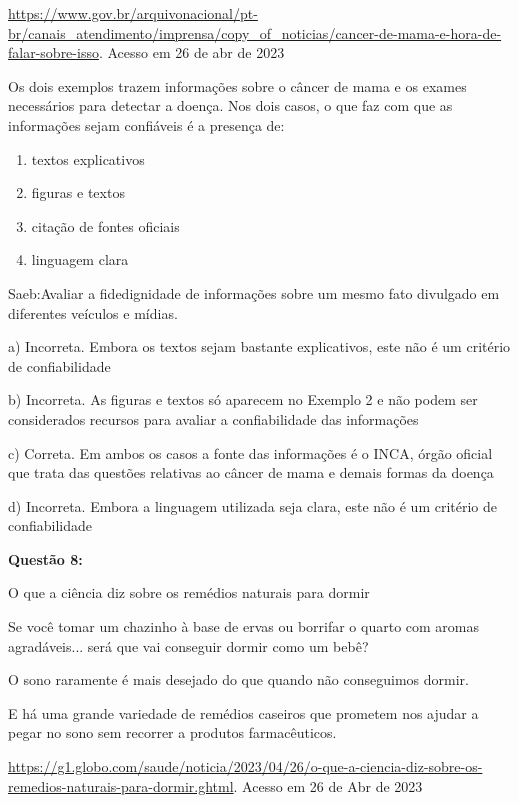 \href{https://www.gov.br/arquivonacional/pt-br/canais_atendimento/imprensa/copy_of_noticias/cancer-de-mama-e-hora-de-falar-sobre-isso}{{https://www.gov.br/arquivonacional/pt-br/canais\_atendimento/imprensa/copy\_of\_noticias/cancer-de-mama-e-hora-de-falar-sobre-isso}}.
Acesso em 26 de abr de 2023

Os dois exemplos trazem informações sobre o câncer de mama e os exames
necessários para detectar a doença. Nos dois casos, o que faz com que as
informações sejam confiáveis é a presença de:

\begin{enumerate}
\def\labelenumi{\alph{enumi})}
\item
  textos explicativos
\item
  figuras e textos
\item
  citação de fontes oficiais
\item
  linguagem clara
\end{enumerate}

Saeb:Avaliar a fidedignidade de informações sobre um mesmo fato
divulgado em diferentes veículos e mídias.

a) Incorreta. Embora os textos sejam bastante explicativos, este não é
um critério de confiabilidade

b) Incorreta. As figuras e textos só aparecem no Exemplo 2 e não podem
ser considerados recursos para avaliar a confiabilidade das informações

c) Correta. Em ambos os casos a fonte das informações é o INCA, órgão
oficial que trata das questões relativas ao câncer de mama e demais
formas da doença

d) Incorreta. Embora a linguagem utilizada seja clara, este não é um
critério de confiabilidade

\textbf{Questão 8:}

O que a ciência diz sobre os remédios naturais para dormir

Se você tomar um chazinho à base de ervas ou borrifar o quarto com
aromas agradáveis... será que vai conseguir dormir como um bebê?

O sono raramente é mais desejado do que quando não conseguimos dormir.

E há uma grande variedade de remédios caseiros que prometem nos ajudar a
pegar no sono sem recorrer a produtos farmacêuticos.

\href{https://g1.globo.com/saude/noticia/2023/04/26/o-que-a-ciencia-diz-sobre-os-remedios-naturais-para-dormir.ghtml}{{https://g1.globo.com/saude/noticia/2023/04/26/o-que-a-ciencia-diz-sobre-os-remedios-naturais-para-dormir.ghtml}}.
Acesso em 26 de Abr de 2023

